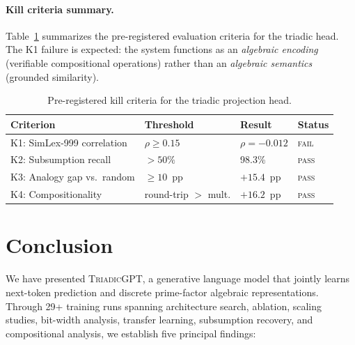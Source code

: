 \documentclass[11pt,a4paper]{article}
\newcommand{\microgpt}{\textsc{TriadicGPT}}
\begin{document}
\paragraph{Kill criteria summary.}
Table~\ref{tab:kill-criteria} summarizes the pre-registered evaluation criteria for the triadic head. The K1 failure is expected: the system functions as an \emph{algebraic encoding} (verifiable compositional operations) rather than an \emph{algebraic semantics} (grounded similarity).

\begin{table}[h]
\centering
\caption{Pre-registered kill criteria for the triadic projection head.}
\label{tab:kill-criteria}
\small
\begin{tabular}{llll}
\toprule
\textbf{Criterion} & \textbf{Threshold} & \textbf{Result} & \textbf{Status} \\
\midrule
K1: SimLex-999 correlation   & $\rho \geq 0.15$   & $\rho = -0.012$ & \textsc{fail} \\
K2: Subsumption recall        & $> 50\%$            & 98.3\%          & \textsc{pass} \\
K3: Analogy gap vs.\ random   & $\geq 10$~pp        & $+15.4$~pp      & \textsc{pass} \\
K4: Compositionality          & round-trip $>$ mult. & $+16.2$~pp      & \textsc{pass} \\
\bottomrule
\end{tabular}
\end{table}

\section{Conclusion}
\label{sec:conclusion}

We have presented \microgpt{}, a generative language model that jointly learns next-token prediction and discrete prime-factor algebraic representations. Through 29+ training runs spanning architecture search, ablation, scaling studies, bit-width analysis, transfer learning, subsumption recovery, and compositional analysis, we establish five principal findings:
\end{document}
